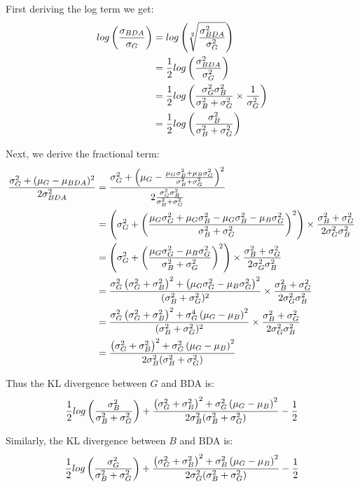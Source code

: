 First deriving the log term we get:
\begin{align}
	log\left(\frac{\sigma_{BDA}}{\sigma_{G}}\right)
	&= log\left(\sqrt[2]{\frac{\sigma_{BDA}^2}{\sigma_{G}^2}}\right)\\
	&= \frac{1}{2} log\left(\frac{\sigma_{BDA}^2}{\sigma_{G}^2}\right)\\
	&= \frac{1}{2} log\left(\frac{\sigma_G^2 \sigma_B^2}{\sigma_B^2 + \sigma_G^2} \times \frac{1}{\sigma_G^2}\right)\\
	&= \frac{1}{2} log\left(\frac{\sigma_B^2}{\sigma_B^2 + \sigma_G^2}\right)
\end{align}

Next, we derive the fractional term:
\begin{align}
	\frac{\sigma_{G}^2 + (\mu_{G} - \mu_{BDA})^2}{2\sigma_{BDA}^2}
	&= \frac{
			\sigma_G^2 + \left(\mu_G - \frac{\mu_G\sigma_B^2 + \mu_B\sigma_G^2}{\sigma_B^2 + \sigma_G^2}\right)^2
		}{
			2 \frac{\sigma_G^2 \sigma_B^2}{\sigma_B^2 + \sigma_G^2}
		}\\
	&= \left(\sigma_G^2 + \left(\frac{\mu_G\sigma_G^2 + \mu_G\sigma_B^2 - \mu_G\sigma_B^2 - \mu_B\sigma_G^2}{\sigma_B^2 + \sigma_G^2}\right)^2\right) \times \frac{\sigma_B^2 + \sigma_G^2}{2\sigma_G^2\sigma_B^2}\\
	&= \left(\sigma_G^2 + \left(\frac{\mu_G\sigma_G^2 - \mu_B\sigma_G^2}{\sigma_B^2 + \sigma_G^2}\right)^2\right) \times \frac{\sigma_B^2 + \sigma_G^2}{2\sigma_G^2\sigma_B^2}\\
	&= \frac{\sigma_G^2\left(\sigma_G^2 + \sigma_B^2\right)^2 + \left(\mu_G\sigma_G^2 - \mu_B\sigma_G^2\right)^2}{(\sigma_B^2 + \sigma_G^2)^2} \times \frac{\sigma_B^2 + \sigma_G^2}{2\sigma_G^2\sigma_B^2}\\
	&= \frac{\sigma_G^2\left(\sigma_G^2 + \sigma_B^2\right)^2 + \sigma_G^4\left(\mu_G - \mu_B\right)^2}{(\sigma_B^2 + \sigma_G^2)^2} \times \frac{\sigma_B^2 + \sigma_G^2}{2\sigma_G^2\sigma_B^2}\\
	&= \frac{\left(\sigma_G^2 + \sigma_B^2\right)^2 + \sigma_G^2\left(\mu_G - \mu_B\right)^2}{2\sigma_B^2(\sigma_B^2 + \sigma_G^2)}
\end{align}

Thus the KL divergence between $G$ and BDA is:
\begin{equation}
	\frac{1}{2} log\left(\frac{\sigma_B^2}{\sigma_B^2 + \sigma_G^2}\right) + \frac{\left(\sigma_G^2 + \sigma_B^2\right)^2 + \sigma_G^2\left(\mu_G - \mu_B\right)^2}{2\sigma_B^2(\sigma_B^2 + \sigma_G^2)} - \frac{1}{2}
\end{equation}

Similarly, the KL divergence between $B$ and BDA is:
\begin{equation}
	\frac{1}{2} log\left(\frac{\sigma_G^2}{\sigma_B^2 + \sigma_G^2}\right) + \frac{\left(\sigma_G^2 + \sigma_B^2\right)^2 + \sigma_B^2\left(\mu_G - \mu_B\right)^2}{2\sigma_G^2(\sigma_B^2 + \sigma_G^2)} - \frac{1}{2}
\end{equation}

